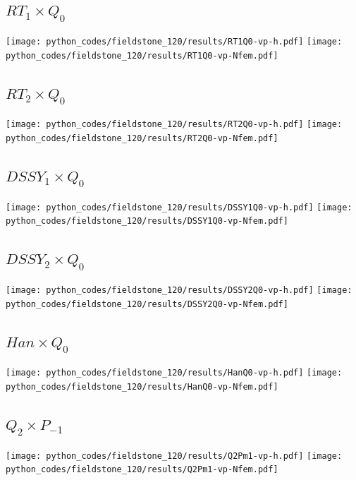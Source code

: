 \subsection*{$RT_1\times Q_0$}
\begin{center}
\texttt{[image: python\_codes/fieldstone\_120/results/RT1Q0-vp-h.pdf]}
\texttt{[image: python\_codes/fieldstone\_120/results/RT1Q0-vp-Nfem.pdf]}
\end{center}

\subsection*{$RT_2\times Q_0$}
\begin{center}
\texttt{[image: python\_codes/fieldstone\_120/results/RT2Q0-vp-h.pdf]}
\texttt{[image: python\_codes/fieldstone\_120/results/RT2Q0-vp-Nfem.pdf]}
\end{center}

\subsection*{$DSSY_1\times Q_0$}
\begin{center}
\texttt{[image: python\_codes/fieldstone\_120/results/DSSY1Q0-vp-h.pdf]}
\texttt{[image: python\_codes/fieldstone\_120/results/DSSY1Q0-vp-Nfem.pdf]}
\end{center}

\subsection*{$DSSY_2\times Q_0$}
\begin{center}
\texttt{[image: python\_codes/fieldstone\_120/results/DSSY2Q0-vp-h.pdf]}
\texttt{[image: python\_codes/fieldstone\_120/results/DSSY2Q0-vp-Nfem.pdf]}
\end{center}

\subsection*{$Han\times Q_0$}
\begin{center}
\texttt{[image: python\_codes/fieldstone\_120/results/HanQ0-vp-h.pdf]}
\texttt{[image: python\_codes/fieldstone\_120/results/HanQ0-vp-Nfem.pdf]}
\end{center}

\subsection*{$Q_2\times P_{-1}$}
\begin{center}
\texttt{[image: python\_codes/fieldstone\_120/results/Q2Pm1-vp-h.pdf]}
\texttt{[image: python\_codes/fieldstone\_120/results/Q2Pm1-vp-Nfem.pdf]}
\end{center}

